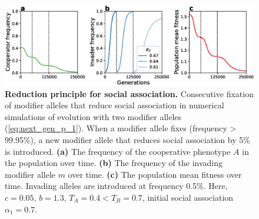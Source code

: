 \documentclass[12pt]{extarticle}
\begin{document}
\begin{figure}[h]
  \centering
   \includegraphics[scale=0.5]{Figures/invasion.eps}
  \caption{
  \textbf{Reduction principle for social association.} 
  Consecutive fixation of modifier alleles that reduce social association in numerical simulations of evolution with two modifier alleles (\autoref{eq:next_gen_p_1}).
  When a modifier allele fixes (frequency > 99.95\%), a new modifier allele that reduces social association by 5\% is introduced. \textbf{(a)} The frequency of the cooperative phenotype $A$ in the population over time. \textbf{(b)} The frequency of the invading modifier allele $m$ over time. \textbf{(c)} The population mean fitness over time. Invading alleles are introduced at frequency 0.5\%.
  Here, $c = 0.05$, $b=1.3$, $T_A=0.4<T_B=0.7$, initial social association $\alpha_1=0.7$.  
  }
  \label{fig:invasion}
\end{figure}


  

\newpage
\end{document}
